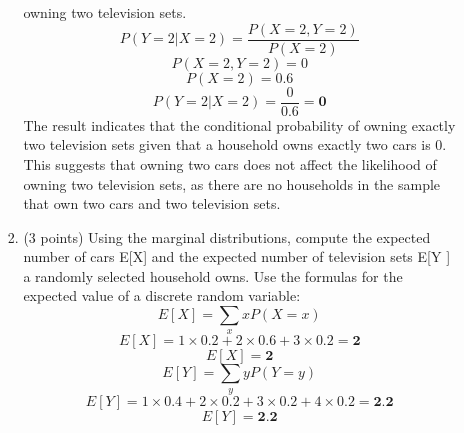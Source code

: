 \documentclass[a3paper,12pt]{article} %
\begin{document}
\begin{enumerate}
\begin{enumerate}
\begin{enumerate}
        owning two television sets.
        \[
            P(Y = 2 |X = 2) = \frac{P(X = 2, Y = 2)}{P(X = 2)}
        \]
        \[
            P(X = 2, Y = 2) = 0
        \]
        \[
            P(X = 2) = 0.6
        \]
        \[
            P(Y = 2 |X = 2) = \frac{0}{0.6} = \textbf{0}
        \]
        The result indicates that the conditional probability of owning exactly two television sets given that a household owns exactly two cars is 0. This suggests that owning two cars does not affect the likelihood of owning two television sets, as there are no households in the sample that own two cars and two television sets.
        \item (3 points) Using the marginal distributions, compute the expected number of cars E[X]
        and the expected number of television sets E[Y ] a randomly selected household owns. Use
        the formulas for the expected value of a discrete random variable:
        \[
            E[X] = \sum_{x} xP(X = x)
        \]
        \[
            E[X] = 1 \times 0.2 + 2 \times 0.6 + 3 \times 0.2 = \textbf{2}
        \]
        \[
            E[X] = \textbf{2}
        \]
        \[
            E[Y] = \sum_{y} yP(Y = y)
        \]
        \[
            E[Y] = 1 \times 0.4 + 2 \times 0.2 + 3 \times 0.2 + 4 \times 0.2 = \textbf{2.2}
        \]
        \[
            E[Y] = \textbf{2.2}
        \]


\end{enumerate}
\end{enumerate}
\end{enumerate}
\end{document}
